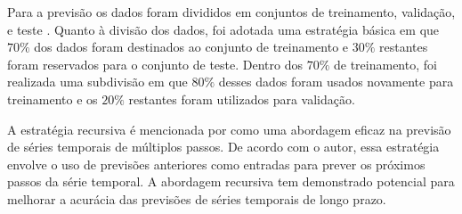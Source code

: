 Para a previsão os dados foram divididos em conjuntos de treinamento, validação, e teste \cite{raschka2015practical, geron2017hands_on}. Quanto à divisão dos dados, foi adotada uma estratégia básica em que $70\%$ dos dados foram destinados ao conjunto de treinamento e $30\%$ restantes foram reservados para o conjunto de teste. Dentro dos $70\%$ de treinamento, foi realizada uma subdivisão em que $80\%$ desses dados foram usados novamente para treinamento e os $20\%$ restantes foram utilizados para validação. 

A estratégia recursiva é mencionada por  como uma abordagem eficaz na previsão de séries temporais de múltiplos passos. De acordo com o autor, essa estratégia envolve o uso de previsões anteriores como entradas para prever os próximos passos da série temporal. A abordagem recursiva tem demonstrado potencial para melhorar a acurácia das previsões de séries temporais de longo prazo.



